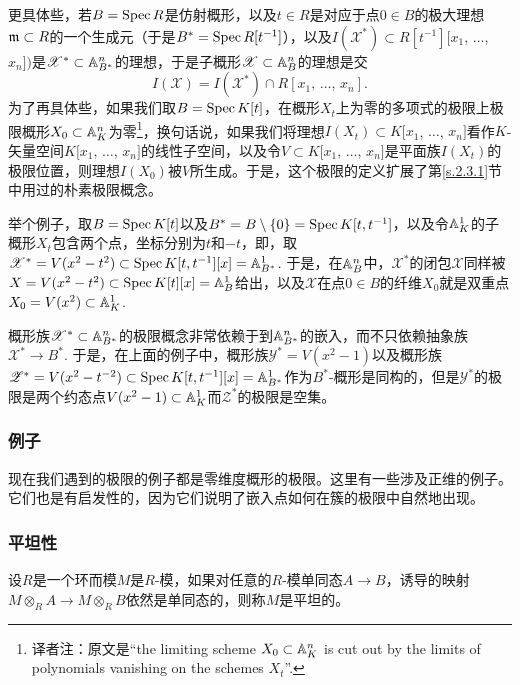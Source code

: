 更具体些，若$B=\operatorname{Spec} R$是仿射概形，以及$t\in R$是对应于点$0\in B$的极大理想$\mathfrak{m}\subset R$的一个生成元（于是$B^*=\operatorname{Spec} R[t^{-1}]$），以及$I(\mathscr{X}^*)\subset R[t^{-1}][x_1$, $\dots$, $x_n])$是$\mathscr{X}^*\subset \mathbb{A}_{B^*}^n$的理想，于是子概形$\mathscr{X}\subset \mathbb{A}_{B}^n$的理想是交
\[
	I(\mathscr{X})=I(\mathscr{X}^*)\cap R[x_1,\,\dots,\,x_n].
\]
为了再具体些，如果我们取$B=\operatorname{Spec} K[t]$，在概形$X_t$上为零的多项式的极限上极限概形$X_0\subset \mathbb{A}_K^n$为零\footnote{译者注：原文是``the limiting scheme $X_0\subset \mathbb{A}_K^n$ is cut out by the limits of polynomials vanishing on the schemes $X_t$''.}\nottran ，换句话说，如果我们将理想$I(X_t)\subset K[x_1$, $\dots$, $x_n]$看作$K$-矢量空间$K[x_1$, $\dots$, $x_n]$的线性子空间，以及令$V\subset K[x_1$, $\dots$, $x_n]$是平面族$I(X_t)$的极限位置\nottran ，则理想$I(X_0)$被$V$所生成。于是，这个极限的定义扩展了第\ref{s.2.3.1}节中用过的朴素极限概念。

举个例子，取$B=\operatorname{Spec} K[t]$以及$B^*=B\setminus \{0\}=\operatorname{Spec} K[t,t^{-1}]$，以及令$\mathbb{A}_K^1$的子概形$X_t$包含两个点，坐标分别为$t$和$-t$，即，取$\mathscr{X}^*=V(x^2-t^2)\subset \operatorname{Spec} K[t,t^{-1}][x]=\mathbb{A}_{B^*}^1$. 于是，在$\mathbb{A}_B^n$中，$\mathscr{X}^*$的闭包$\mathscr{X}$同样被$X=V(x^2-t^2)\subset \operatorname{Spec} K[t][x]=\mathbb{A}_B^1$给出，以及$\mathscr{X}$在点$0\in B$的纤维$X_0$就是双重点$X_0=V(x^2)\subset\mathbb{A}_K^1$.

概形族$\mathscr{X}^*\subset \mathbb{A}_{B^*}^n$的极限概念非常依赖于到$\mathbb{A}_{B^*}^n$的嵌入，而不只依赖抽象族$\mathscr{X}^*\to B^*$. 于是，在上面的例子中，概形族$\mathscr{Y}^*=V(x^2-1)$以及概形族$\mathscr{Z}^*=V(x^2-t^{-2})\subset \operatorname{Spec} K[t,t^{-1}][x]=\mathbb{A}_{B^*}^1$作为$B^*$-概形是同构的，但是$\mathscr{Y}^*$的极限是两个约态点$V(x^2-1)\subset \mathbb{A}^1_K$而$\mathscr{Z}^*$的极限是空集。

\subsubsection*{例子}

现在我们遇到的极限的例子都是零维度概形的极限。这里有一些涉及正维的例子。 它们也是有启发性的，因为它们说明了嵌入点如何在簇的极限中自然地出现。

\subsubsection*{平坦性}

\begin{defi}
	设$R$是一个环而模$M$是$R$-模，如果对任意的$R$-模单同态$A\to B$，诱导的映射$M\otimes_R A\to M\otimes_R B$依然是单同态的，则称$M$是平坦的。
\end{defi}

